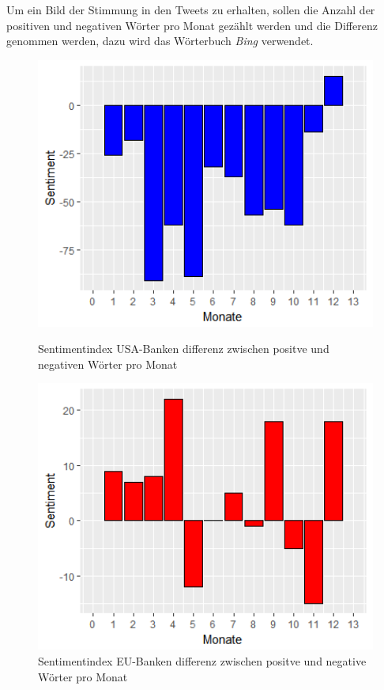 Um ein Bild der Stimmung in den Tweets zu erhalten, sollen die Anzahl der positiven und negativen Wörter pro Monat gezählt werden und die Differenz genommen werden, dazu wird das Wörterbuch \textit{Bing} verwendet.
\begin{figure}[H]
	\begin{minipage}[b]{.4\linewidth} %
	\includegraphics[width=1\textwidth]{Pictures/Monatusa.png}
	\caption{Sentimentindex USA-Banken differenz  zwischen positve und negativen Wörter pro Monat}\label{usadiff}
	
\end{minipage}
	\hspace{.2\linewidth}
\begin{minipage}[b]{.4\linewidth} %
	\includegraphics[width=1\textwidth]{Pictures/Monateu.png}
	\caption{Sentimentindex EU-Banken differenz  zwischen positve und negative Wörter pro Monat}\label{eudiff}
\end{minipage}
\end{figure}
